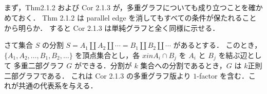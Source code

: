 \subsection{}
まず，Thm2.1.2 および Cor 2.1.3 が，多重グラフについても成り立つことを確かめておく．
Thm 2.1.2 は parallel edge を消してもすべての条件が保たれることから明らか．
すると Cor 2.1.3 は単純グラフと全く同様に示せる．

さて集合 $S$ の分割 $S = A_1\amalg A_2\amalg \cdots = B_1\amalg B_2\amalg \cdots$ があるとする．
このとき，$\{A_1,A_2,\ldots,B_1,B_2,\ldots\}$ を頂点集合とし，各 $x in A_i\cap B_j$ を $A_i$ と $B_j$ を結ぶ辺として
多重二部グラフ $G$ ができる．分割が $k$ 集合への分割であるとき，$G$ は $k$正則二部グラフである．
これは Cor 2.1.3 の多重グラフ版より $1$-factor を含む．これが共通の代表系を与える．
